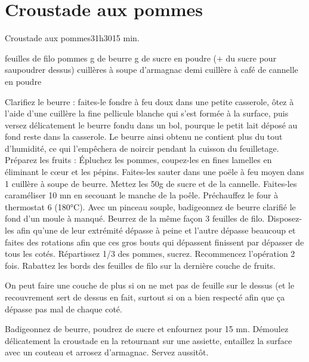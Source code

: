 {\section{Croustade aux pommes}
\begin{recette}{Croustade aux pommes}{3}{1h30}{15 min.}
\begin{ingredients}
 feuilles de filo
 pommes
 g de beurre
 g de sucre en poudre (+ du sucre pour saupoudrer dessus)
 cuillères à soupe d'armagnac
 demi cuillère à café de cannelle en poudre
\end{ingredients}


\begin{preparation}
\etape Clarifiez le beurre : faites-le fondre à feu doux dans une petite casserole, ôtez à l'aide d'une cuillère la fine 
pellicule blanche qui s'est formée à la surface, puis versez délicatement le beurre fondu dans un bol, pourque le petit lait 
déposé au fond reste dans la casserole. Le beurre ainsi obtenu ne contient plus du tout d'humidité, ce qui l'empêchera de 
noircir pendant la cuisson du feuilletage.
\etape Préparez les fruits : Épluchez les pommes, coupez-les en fines lamelles en éliminant le cœur et les pépins. 
\etape Faites-les 
sauter dans une poële à feu moyen dans 1 cuillère à soupe de beurre. Mettez les 50g de sucre et de la cannelle. 
Faites-les 
caraméliser 10 mn en secouant le manche de la poêle.
\etape Préchauffez le four à thermostat 6 (180°C).
\etape Avec un pinceau souple, badigeonnez de beurre clarifié le fond d'un moule à manqué. 
\etape Beurrez de la même façon 3 feuilles de filo. Disposez-les afin qu'une de leur extrémité dépasse à peine et l'autre 
dépasse beaucoup et faites des rotations afin que ces gros bouts qui dépassent finissent par dépasser de tous les cotés.  
Répartissez 1/3 des pommes, sucrez. Recommencez l'opération 2 fois. Rabattez les bords des feuilles de filo sur la dernière 
couche de fruits.
\begin{remarque}
On peut faire une couche de plus si on ne met pas de feuille sur le dessus (et le recouvrement sert de dessus en fait, surtout 
si on a bien respecté afin que ça dépasse pas mal de chaque coté.
\end{remarque}

\end{preparation}

\begin{cuisson}
Badigeonnez de beurre, poudrez de sucre et enfournez pour 15 mn.
Démoulez délicatement la croustade en la retournant sur une assiette, entaillez la surface avec un couteau et arrosez 
d'armagnac.
Servez aussitôt.
\end{cuisson}
\end{recette}

}
